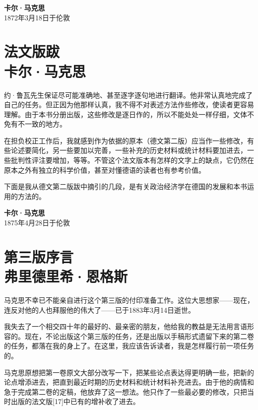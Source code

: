 \documentclass{ctexbook}
\begin{document}
\begin{flushright}
    \textbf{卡尔·马克思}\\
    \small{1872年3月18日于伦敦}
\end{flushright}


\chapter[卡尔·马克思\hspace{1em}法文版跋]{法文版跋\\{\small 卡尔·马克思}}

约·鲁瓦先生保证尽可能准确地、甚至逐字逐句地进行翻译。他非常认真地完成了自己的任务。但正因为他那样认真，我不得不对表述方法作些修改，使读者更容易理解。由于本书分册出版，这些修改是逐日作的，所以不能处处一样仔细，文体不免有不一致的地方。

在担负校正工作后，我就感到作为依据的原本（德文第二版）应当作一些修改，有些论述要简化，另一些要加以完善，一些补充的历史材料或统计材料要加进去，一些批判性评注要增加，等等。不管这个法文版本有怎样的文字上的缺点，它仍然在原本之外有独立的科学价值，甚至对懂德语的读者也有参考价值。

下面是我从德文第二版跋中摘引的几段，是有关政治经济学在德国的发展和本书运用的方法的。

\begin{flushright}
    \textbf{卡尔·马克思}\\
    \small{1875年4月28日于伦敦}
\end{flushright}


\chapter[弗里德里希·恩格斯\hspace{1em}第三版序言]{第三版序言\\{\small 弗里德里希·恩格斯}}

马克思不幸已不能亲自进行这个第三版的付印准备工作。这位大思想家——现在，连反对他的人也拜服他的伟大了——已于1883年3月14日逝世。

我失去了一个相交四十年的最好的、最亲密的朋友，他给我的教益是无法用言语形容的。现在，不论出版这个第三版的任务，还是出版以手稿形式遗留下来的第二卷的任务，都落在我的身上了。在这里，我应该告诉读者，我是怎样履行前一项任务的。

马克思原想把第一卷原文大部分改写一下，把某些论点表达得更明确一些，把新的论点增添进去，把直到最近时期的历史材料和统计材料补充进去。由于他的病情和急于完成第二卷的定稿，他放弃了这一想法。他只作了一些最必要的修改，只把当时出版的法文版[17]中已有的增补收了进去。
\end{document}
